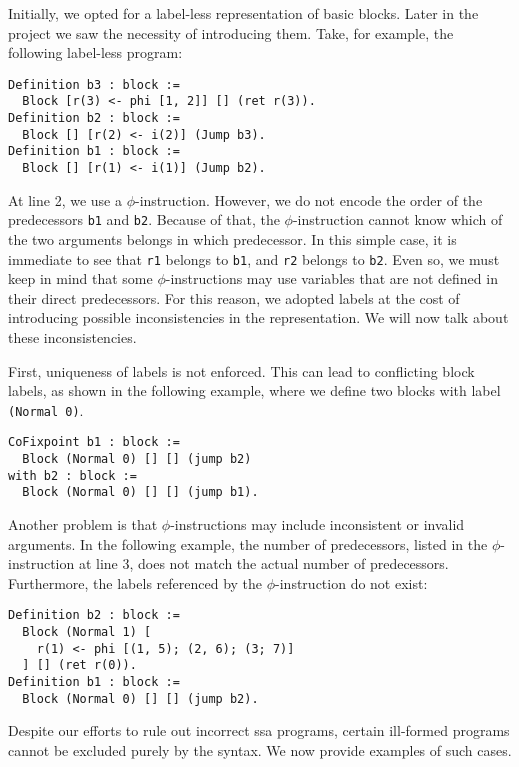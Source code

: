 Initially, we opted for a label-less representation of basic blocks.
Later in the project we saw the necessity of introducing them. Take, for example, the following label-less program:

\begin{lstlisting}[style=Rocq]
Definition b3 : block :=
  Block [r(3) <- phi [1, 2]] [] (ret r(3)).
Definition b2 : block :=
  Block [] [r(2) <- i(2)] (Jump b3).
Definition b1 : block :=
  Block [] [r(1) <- i(1)] (Jump b2).
\end{lstlisting}

At line 2, we use a $\phi$-instruction. However, we do not encode the order of the predecessors \texttt{b1} and \texttt{b2}. Because of that, the $\phi$-instruction cannot know which of the two arguments belongs in which predecessor. In this simple case, it is immediate to see that \texttt{r1} belongs to \texttt{b1}, and \texttt{r2} belongs to \texttt{b2}. Even so, we must keep in mind that some $\phi$-instructions may use variables that are not defined in their direct predecessors. For this reason, we adopted labels at the cost of introducing possible inconsistencies in the representation. We will now talk about these inconsistencies.

First, uniqueness of labels is not enforced. This can lead to conflicting block labels, as shown in the following example, where we define two blocks with label \texttt{(Normal 0)}.

\begin{lstlisting}[style=Rocq]
CoFixpoint b1 : block :=
  Block (Normal 0) [] [] (jump b2)
with b2 : block :=
  Block (Normal 0) [] [] (jump b1).
\end{lstlisting}

Another problem is that $\phi$-instructions may include inconsistent or invalid arguments. In the following example, the number of predecessors, listed in the $\phi$-instruction at line 3, does not match the actual number of predecessors. Furthermore, the labels referenced by the $\phi$-instruction do not exist:

\begin{lstlisting}[style=Rocq]
Definition b2 : block :=
  Block (Normal 1) [
    r(1) <- phi [(1, 5); (2, 6); (3; 7)]
  ] [] (ret r(0)).
Definition b1 : block :=
  Block (Normal 0) [] [] (jump b2).
\end{lstlisting}

Despite our efforts to rule out incorrect \gls{ssa} programs, certain ill-formed programs cannot be excluded purely by the syntax. We now provide examples of such cases.

